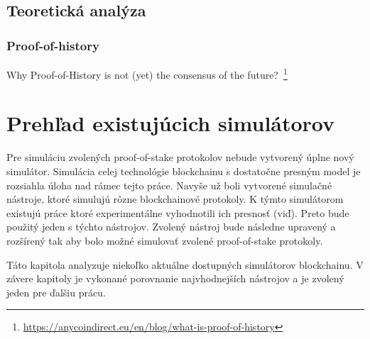 \section{Teoretická analýza}\label{sec:solana-teor}

\subsection{Proof-of-history}

Why Proof-of-History is not (yet) the consensus of the future?~\footnote{\url{https://anycoindirect.eu/en/blog/what-is-proof-of-history}}

\chapter{Prehľad existujúcich simulátorov}

Pre simuláciu zvolených proof-of-stake protokolov nebude vytvorený úplne nový simulátor. Simulácia celej technológie blockchainu s dostatočne presným model je rozsiahla úloha nad rámec tejto práce. Navyše už boli vytvorené simulačné nástroje, ktoré simulujú rôzne blockchainové protokoly. K týmto simulátorom existujú práce ktoré experimentálne vyhodnotili ich presnosť (viď\cite{simulatorCompar, fanPerfEval}). Preto bude použitý jeden s týchto nástrojov. Zvolený nástroj bude následne upravený a rozšírený tak aby bolo možné simulovať zvolené proof-of-stake protokoly. 

Táto kapitola analyzuje niekoľko aktuálne dostupných simulátorov blockchainu. V závere kapitoly je vykonané porovnanie najvhodnejších nástrojov a je zvolený jeden pre ďalšiu prácu.


